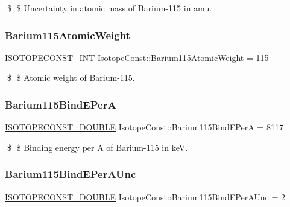 \$ \$ Uncertainty in atomic mass of Barium-\/115 in amu. \mbox{\label{group___isotope_const-_barium-_ba115_ga5ffb6f535c61ca44d2b1c18413969cd8}} 
\subsubsection{\texorpdfstring{Barium115\+Atomic\+Weight}{Barium115AtomicWeight}}
{\footnotesize\ttfamily \mbox{\hyperlink{group___isotope_const-_macros_ga5f18360b3e99483a35c32d789e62621c}{I\+S\+O\+T\+O\+P\+E\+C\+O\+N\+S\+T\+\_\+\+I\+NT}} Isotope\+Const\+::\+Barium115\+Atomic\+Weight = 115}

\$ \$ Atomic weight of Barium-\/115. \mbox{\label{group___isotope_const-_barium-_ba115_ga1fcefa09365633c714649f81ff866ed3}} 
\subsubsection{\texorpdfstring{Barium115\+Bind\+E\+PerA}{Barium115BindEPerA}}
{\footnotesize\ttfamily \mbox{\hyperlink{group___isotope_const-_macros_ga8f45a7272ce02c0b4c65c44636ed719a}{I\+S\+O\+T\+O\+P\+E\+C\+O\+N\+S\+T\+\_\+\+D\+O\+U\+B\+LE}} Isotope\+Const\+::\+Barium115\+Bind\+E\+PerA = 8117}

\$ \$ Binding energy per A of Barium-\/115 in keV. \mbox{\label{group___isotope_const-_barium-_ba115_gabba7cf1d681f8d810f33d7f71363fe4e}} 
\subsubsection{\texorpdfstring{Barium115\+Bind\+E\+Per\+A\+Unc}{Barium115BindEPerAUnc}}
{\footnotesize\ttfamily \mbox{\hyperlink{group___isotope_const-_macros_ga8f45a7272ce02c0b4c65c44636ed719a}{I\+S\+O\+T\+O\+P\+E\+C\+O\+N\+S\+T\+\_\+\+D\+O\+U\+B\+LE}} Isotope\+Const\+::\+Barium115\+Bind\+E\+Per\+A\+Unc = 2}


